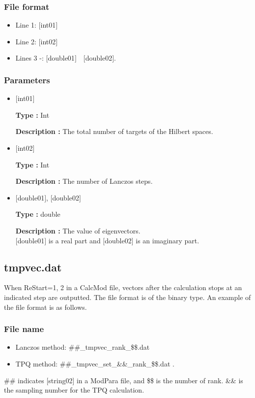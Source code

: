 \subsubsection{File format}
 \begin{itemize}
   \item  Line 1: $[$int01$]$
   \item  Line 2: $[$int02$]$
   \item  Lines 3 -: $[$double01$]$~~$[$double02$]$.
  \end{itemize}
  
\subsubsection{Parameters}
 \begin{itemize}

  \item  $[$int01$]$

 {\bf Type :} Int

{\bf Description :}  The total number of targets of the Hilbert spaces.

  \item  $[$int02$]$

 {\bf Type :} Int

{\bf Description :}  { The number of Lanczos steps.}

 \item  $[$double01$]$, $[$double02$]$

 {\bf Type :} double 

{\bf Description :} The value of eigenvectors.\\
$[$double01$]$ is a real part and $[$double02$]$ is an imaginary part.\\

 \end{itemize}

\newpage
\subsection{{tmpvec.dat}}
\label{Subsec:restart}
When ReStart=1, 2 in a CalcMod file, vectors after the calculation stops at an indicated step are outputted. The file format is of the binary type.  An example of the file format is as follows.

\subsubsection{File name}
\begin{itemize}
   \item{Lanczos method: \#\#\_tmpvec\_rank\_\$\$.dat}
   \item{TPQ method: \#\#\_tmpvec\_set\_\&\&\_rank\_\$\$.dat}  .
\end{itemize}
  \#\# indicates [string02] in a ModPara file, and \$\$ is the number of rank. \&\& is the sampling number for the TPQ calculation. 

